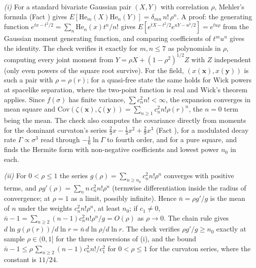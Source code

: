 \emph{(i)} For a standard bivariate Gaussian pair $(X, Y)$ with correlation $\rho$, Mehler's formula (Fact ) gives $E[\mathrm{He}_{m}(X)\mathrm{He}_{n}(Y)] = \delta_{mn}\, n!\, \rho^{n}$. A proof: the generating function $e^{tx - t^{2}/2} = \sum_{n} \mathrm{He}_{n}(x)t^{n}/n!$ gives $E[e^{tX - t^{2}/2}e^{uY - u^{2}/2}] = e^{tu\rho}$ from the Gaussian moment generating function, and comparing coefficients of $t^{m}u^{n}$ gives the identity. The check verifies it exactly for $m, n \le 7$ as polynomials in $\rho$, computing every joint moment from $Y = \rho X + (1 - \rho^{2})^{1/2}Z$ with $Z$ independent (only even powers of the square root survive). For the field, $(x(\mathbf{x}), x(\mathbf{y}))$ is such a pair with $\rho = \rho(r)$; for a quasi-free state the same holds for Wick powers at spacelike separation, where the two-point function is real and Wick's theorem applies. Since $f(\sigma)$ has finite variance, $\sum c_{n}^{2}n! < \infty$, the expansion converges in mean square and $\mathrm{Cov}(\zeta(\mathbf{x}), \zeta(\mathbf{y})) = \sum_{n \ge 1}c_{n}^{2}n!\rho(r)^{n}$, the $n = 0$ term being the mean. The check also computes the covariance directly from moments for the dominant curvaton's series $\tfrac23 x - \tfrac13 x^{2} + \tfrac29 x^{3}$ (Fact ), for a modulated decay rate $\Gamma \propto \sigma^{3}$ read through $-\tfrac16 \ln\Gamma$ to fourth order, and for a pure square, and finds the Hermite form with non-negative coefficients and lowest power $n_{0}$ in each.

\emph{(ii)} For $0 < \rho \le 1$ the series $g(\rho) = \sum_{n \ge n_{0}}c_{n}^{2}n!\rho^{n}$ converges with positive terms, and $\rho g'(\rho) = \sum_{n}n\,c_{n}^{2}n!\rho^{n}$ (termwise differentiation inside the radius of convergence; at $\rho = 1$ as a limit, possibly infinite). Hence $\bar n = \rho g'/g$ is the mean of $n$ under the weights $c_{n}^{2}n!\rho^{n}$, at least $n_{0}$; if $c_{1} \neq 0$, $\bar n - 1 = \sum_{n \ge 2}(n - 1)c_{n}^{2}n!\rho^{n}/g = O(\rho)$ as $\rho \to 0$. The chain rule gives $d\ln g(\rho(r))/d\ln r = \bar n\, d\ln\rho/d\ln r$. The check verifies $\rho g'/g \ge n_{0}$ exactly at sample $\rho \in (0, 1]$ for the three conversions of (i), and the bound $\bar n - 1 \le \rho\,\sum_{n \ge 2}(n - 1)c_{n}^{2}n!/c_{1}^{2}$ for $0 < \rho \le 1$ for the curvaton series, where the constant is $11/24$.

